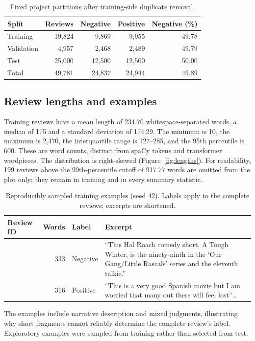 \begin{table}[htbp]\centering
\caption{Fixed project partitions after training-side duplicate removal.}\label{tab:splits}
\begin{tabular}{lrrrr}\toprule
Split & Reviews & Negative & Positive & Negative (\%)\\\midrule
Training & 19,824 & 9,869 & 9,955 & 49.78\\
Validation & 4,957 & 2,468 & 2,489 & 49.79\\
Test & 25,000 & 12,500 & 12,500 & 50.00\\\midrule
Total & 49,781 & 24,837 & 24,944 & 49.89\\\bottomrule
\end{tabular}
\end{table}

\subsection{Review lengths and examples}
Training reviews have a mean length of 234.70 whitespace-separated words, a median
of 175 and a standard deviation of 174.29. The minimum is 10, the maximum is
2,470, the interquartile range is 127--285, and the 95th percentile is 600.
These are word counts, distinct from spaCy tokens and transformer wordpieces.
The distribution is right-skewed (Figure~\ref{fig:lengths}). For readability,
199 reviews above the 99th-percentile cutoff of 917.77 words are omitted from
the plot only; they remain in training and in every summary statistic.

\begin{table}[htbp]\centering\small
\caption{Reproducibly sampled training examples (seed 42). Labels apply to the complete reviews; excerpts are shortened.}\label{tab:examples}
\begin{tabularx}{\linewidth}{@{}lrlY@{}}\toprule
Review ID & Words & Label & Excerpt\\\midrule
{} & 333 & Negative &
``This Hal Roach comedy short, A Tough Winter, is the ninety-ninth in the `Our Gang/Little Rascals' series and the eleventh talkie.''\\
 & 316 & Positive &
``This is a very good Spanish movie but I am worried that many out there will feel lost''\ldots\\\bottomrule
\end{tabularx}
\end{table}
The examples include narrative description and mixed judgments, illustrating
why short fragments cannot reliably determine the complete review's label.
Exploratory examples were sampled from training rather than selected from test.

